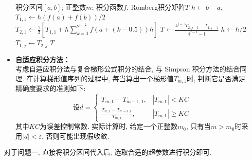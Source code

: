 \documentclass[UTF8,ctexart,a4paper,11pt,openany]{article}
\theoremstyle{definition}
\newcommand\e{\leftarrow}
\begin{document}
\begin{itemize}
\begin{algorithm}[H]
                \begin{algorithmic}[1]
                    \Require 积分区间$[a,b]$; 正整数$m$; 积分函数$f$.
                    \Ensure Romberg积分矩阵$T$
                        \State $h\e b-a$, $T_{1,1}\e h(f(a)+f(b))/2$
                            \State $T_{2,1}\e \frac{1}{2}[T_{1,1}+h\sum_{k=1}^{2^{i-2}}f(a+(k-0.5))h]$
                                \State $T \e \frac{4^{j-1}T_{2,j-1}-T_{1,j-1}}{4^{j-1}-1}$
                            \EndFor
                            \State $h\e h/2$
                                \State $T_{1,j}\e T_{2,j}$
                            \EndFor
                        \EndFor
                        \State \Return $T$
                    \EndFunction
                \end{algorithmic}
            \end{algorithm}
            \item \textbf{自适应积分方法：} \\ 考虑自适应积分法与复合梯形公式积分的结合, 与 Simpson 积分方法的结合同理. 在计算梯形值序列的过程中, 每当算出一个梯形值$T_{m,1}$时, 判断它是否满足精确度要求的准则如下: $$\text{设}d=\left\{\begin{array}{ll}T_{m, 1}-T_{m-1,1}, & \left|T_{m, 1}\right|<K C \\ \frac{T_{m, 1}-T_{m-1,1}}{T_{m, 1}}, & \left|T_{m, 1}\right| \geq K C\end{array}\right.$$其中$KC$为误差控制常数. 实际计算时, 给定一个正整数$m_0$, 只有当$m>m_0$时采用$|d|<\varepsilon$, 否则可能出现假收敛. 
        \end{itemize}

        \par 对于问题一, 直接将积分区间代入后, 选取合适的超参数进行积分即可. 
\end{document}
